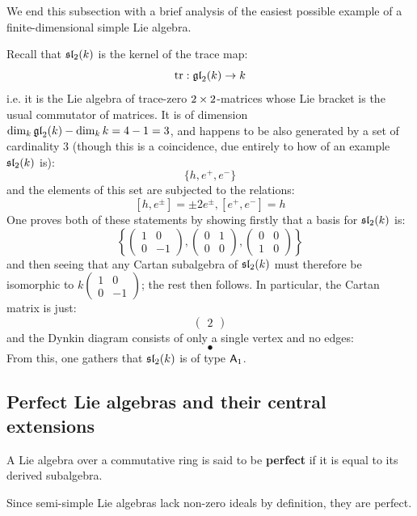             We end this subsection with a brief analysis of the easiest possible example of a finite-dimensional simple Lie algebra. 
            \begin{example}[$\sl_2$]
                Recall that $\sl_2(k)$ is the kernel of the trace map:
                    $$\trace: \gl_2(k) \to k$$
                i.e. it is the Lie algebra of trace-zero $2 \x 2$-matrices whose Lie bracket is the usual commutator of matrices. It is of dimension $\dim_k \gl_2(k) - \dim_k k = 4 - 1 = 3$, and happens to be also generated by a set of cardinality $3$ (though this is a coincidence, due entirely to how  of an example $\sl_2(k)$ is):
                    $$\{h, e^+, e^-\}$$
                and the elements of this set are subjected to the relations:
                    $$[h, e^{\pm}] = \pm 2 e^{\pm}, [e^+, e^-] = h$$
                One proves both of these statements by showing firstly that a basis for $\sl_2(k)$ is:
                    $$\left\{ \begin{pmatrix} 1 & 0 \\ 0 & -1 \end{pmatrix}, \begin{pmatrix} 0 & 1 \\ 0 & 0 \end{pmatrix}, \begin{pmatrix} 0 & 0 \\ 1 & 0 \end{pmatrix} \right\}$$
                and then seeing that any Cartan subalgebra of $\sl_2(k)$ must therefore be isomorphic to $k \begin{pmatrix} 1 & 0 \\ 0 & -1 \end{pmatrix}$; the rest then follows. In particular, the Cartan matrix is just:
                    $$\begin{pmatrix} 2 \end{pmatrix}$$
                and the Dynkin diagram consists of only a single vertex and no edges:
                    $$\bullet$$
                From this, one gathers that $\sl_2(k)$ is of type $\sfA_1$. 
            \end{example}

        \subsection{Perfect Lie algebras and their central extensions}
            \begin{definition}
                A Lie algebra over a commutative ring is said to be \textbf{perfect} if it is equal to its derived subalgebra. 
            \end{definition}
            \begin{example}
                Since semi-simple Lie algebras lack non-zero ideals by definition, they are perfect. 
            \end{example}

